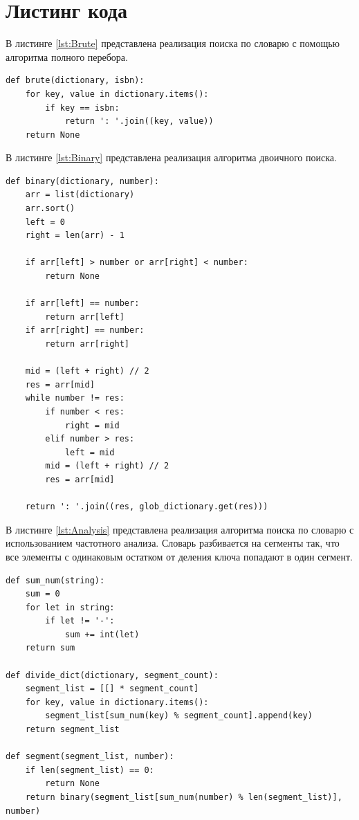 \documentclass[12pt]{report}
\begin{document}
\newpage
\section{Листинг кода}

В листинге \ref{lst:Brute} представлена реализация поиска по словарю с помощью алгоритма полного перебора.

\begin{lstlisting}[label={lst:Brute},caption=Реализация поиска по словарю с помощью алгоритма полного перебора.]
def brute(dictionary, isbn):
	for key, value in dictionary.items():
		if key == isbn:
			return ': '.join((key, value))
	return None
\end{lstlisting} 

\vspace{\baselineskip}
В листинге \ref{lst:Binary} представлена реализация алгоритма двоичного поиска.
\begin{lstlisting}[label={lst:Binary},caption=Реализация алгоритма двоичного поиска.]
def binary(dictionary, number):
	arr = list(dictionary)
	arr.sort()
	left = 0
	right = len(arr) - 1

	if arr[left] > number or arr[right] < number:
		return None

	if arr[left] == number:
		return arr[left]
	if arr[right] == number:
		return arr[right]

	mid = (left + right) // 2
	res = arr[mid]
	while number != res:
		if number < res:
			right = mid
		elif number > res:
			left = mid
		mid = (left + right) // 2
		res = arr[mid]

	return ': '.join((res, glob_dictionary.get(res)))
\end{lstlisting}

\newpage
В листинге \ref{lst:Analysis} представлена реализация алгоритма поиска по словарю с использованием частотного анализа. Словарь разбивается на сегменты так, что все элементы с одинаковым остатком от деления ключа попадают в один сегмент.
\begin{lstlisting}[label={lst:Analysis},caption=Реализация алгоритма поиска по словарю с использованием частотного анализа.]
def sum_num(string):
	sum = 0
	for let in string:
		if let != '-':
			sum += int(let)
	return sum

def divide_dict(dictionary, segment_count):
	segment_list = [[] * segment_count]
	for key, value in dictionary.items():
		segment_list[sum_num(key) % segment_count].append(key)
	return segment_list

def segment(segment_list, number):
	if len(segment_list) == 0:
		return None
	return binary(segment_list[sum_num(number) % len(segment_list)], number)
\end{lstlisting}
\end{document}
